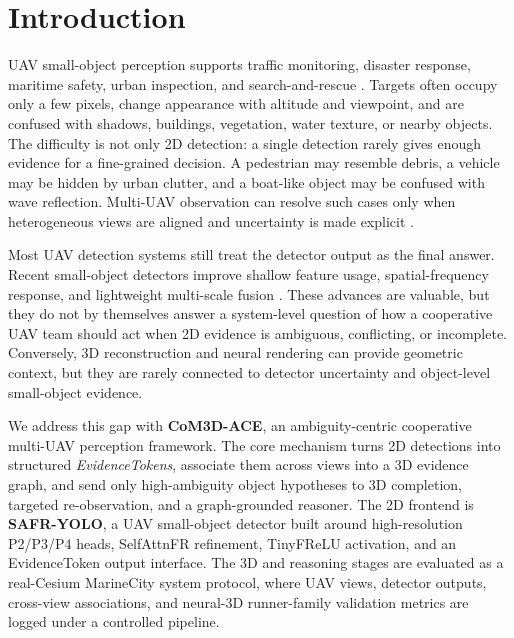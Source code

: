 \section{Introduction}
\label{sec:introduction}

UAV small-object perception supports traffic monitoring, disaster response,
maritime safety, urban inspection, and search-and-rescue
\cite{hu2024universalyolo,jiang2024mffsodnet,sadeghibakhi2025comparison}.
Targets often occupy only a few pixels, change appearance with altitude and
viewpoint, and are confused with shadows, buildings, vegetation, water texture,
or nearby objects. The difficulty is not only 2D detection: a single detection
rarely gives enough evidence for a fine-grained decision. A pedestrian may
resemble debris, a vehicle may be hidden by urban clutter, and a boat-like
object may be confused with wave reflection. Multi-UAV observation can resolve
such cases only when heterogeneous views are aligned and uncertainty is made
explicit \cite{zhang2024attention4align,cai2025neusis}.

Most UAV detection systems still treat the detector output as the final answer.
Recent small-object detectors improve shallow feature usage, spatial-frequency
response, and lightweight multi-scale fusion
\cite{hu2024universalyolo,jiang2024mffsodnet,bai2025sffefyolo,chao2025bpdyolo,hu2025csfprrtdetr,yang2026uavdet}.
These advances are valuable, but they do not by themselves answer a system-level
question of how a cooperative UAV team should act when 2D evidence is
ambiguous, conflicting, or incomplete. Conversely, 3D reconstruction and neural
rendering can provide geometric context, but they are rarely connected to
detector uncertainty and object-level small-object evidence.

We address this gap with \textbf{CoM3D-ACE}, an ambiguity-centric cooperative
multi-UAV perception framework. The core mechanism turns 2D detections into
structured \emph{EvidenceTokens}, associate them across views into a 3D evidence
graph, and send only high-ambiguity object hypotheses to 3D completion,
targeted re-observation, and a graph-grounded reasoner. The 2D frontend is
\textbf{SAFR-YOLO}, a UAV small-object detector built around high-resolution
P2/P3/P4 heads, SelfAttnFR refinement, TinyFReLU activation, and an
EvidenceToken output interface. The 3D and reasoning stages are evaluated as a
real-Cesium MarineCity system protocol, where UAV views, detector outputs,
cross-view associations, and neural-3D runner-family validation metrics are logged
under a controlled pipeline.

